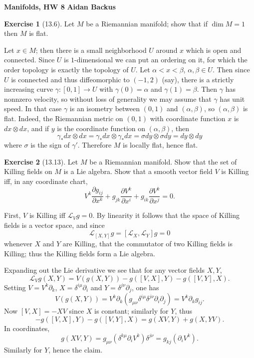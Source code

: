 \documentclass[10pt]{article}
\theoremstyle{definition}
\newtheorem{exer}{Exercise}
\begin{document}
\noindent
\large\textbf{Manifolds, HW 8} \hfill \textbf{Aidan Backus} \\


\begin{exer}[13.6]
Let $M$ be a Riemannian manifold; show that if $\dim M = 1$ then $M$ is flat.
\end{exer}

Let $x \in M$; then there is a small neighborhood $U$ around $x$ which is open and connected.
Since $U$ is $1$-dimensional we can put an ordering on it, for which the order topology is exactly the topology of $U$.
Let $\alpha < x < \beta$, $\alpha, \beta \in U$.
Then since $U$ is connected and thus diffeomorphic to $(-1, 2)$ (say), there is a strictly increasing curve $\gamma: [0, 1] \to U$ with $\gamma(0) = \alpha$ and $\gamma(1) = \beta$.
Then $\gamma$ has nonnzero velocity, so without loss of generality we may assume that $\gamma$ has unit speed.
In that case $\gamma$ is an isometry between $(0, 1)$ and $(\alpha, \beta)$, so $(\alpha, \beta)$ is flat.
Indeed, the Riemannian metric on $(0, 1)$ with coordinate function $x$ is $dx \otimes dx$, and if $y$ is the coordinate function on $(\alpha, \beta)$, then
$$\gamma_* dx \otimes dx = \gamma_* dx \otimes \gamma_* dx = \sigma dy \otimes \sigma dy = dy \otimes dy$$
where $\sigma$ is the sign of $\gamma'$.
Therefore $M$ is locally flat, hence flat.

\begin{exer}[13.13]
Let $M$ be a Riemannian manifold.
Show that the set of Killing fields on $M$ is a Lie algebra.
Show that a smooth vector field $V$ is Killing iff, in any coordinate chart,
$$V^k \frac{\partial g_{ij}}{\partial x^k} + g_{jk}\frac{\partial V^k}{\partial x^i} + g_{ik}\frac{\partial V^k}{\partial x^j} = 0.$$
\end{exer}

First, $V$ is Killing iff $\mathcal L_Vg = 0$.
By linearity it follows that the space of Killing fields is a vector space, and since
$$\mathcal L_{[X, Y]}g = [\mathcal L_X, \mathcal L_Y]g = 0$$
whenever $X$ and $Y$ are Killing,
that the commutator of two Killing fields is Killing; thus the Killing fields form a Lie algebra.

Expanding out the Lie derivative we see that for any vector fields $X,Y$,
$$\mathcal L_Vg(X, Y) = V(g(X, Y)) - g([V, X], Y) - g([V, Y], X).$$
Setting $V = V^k \partial_k$, $X = \delta^{i\mu} \partial_i$ and $Y = \delta^{j\nu} \partial_j$, one has
$$V(g(X, Y)) = V^k \partial_k(g_{\mu\nu} \delta^{i\mu} \delta^{j\nu} \partial_i \partial_j) = V^k \partial_k g_{ij}.$$
Now $[V, X] = -XV$ since $X$ is constant; similarly for $Y$, thus
$$- g([V, X], Y) - g([V, Y], X) = g(XV, Y) + g(X, YV).$$
In coordinates,
$$g(XV, Y) = g_{\mu\nu}(\delta^{k\mu} \partial_i V^k)\delta^{j\nu} = g_{kj}(\partial_i V^k).$$
Similarly for $Y$, hence the claim.
\end{document}

